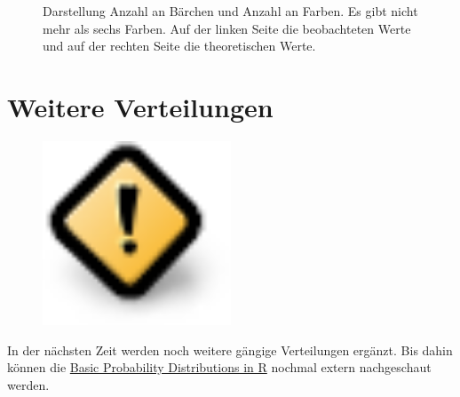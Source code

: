 \documentclass[
  letterpaper,
]{scrbook}
\begin{document}
\begin{figure}
\begin{minipage}[t]{0.50\linewidth}
{{}

}

\end{minipage}%

\caption{\label{fig-pois-03}Darstellung Anzahl an Bärchen und Anzahl an
Farben. Es gibt nicht mehr als sechs Farben. Auf der linken Seite die
beobachteten Werte und auf der rechten Seite die theoretischen Werte.}

\end{figure}

\hypertarget{weitere-verteilungen}{%
\section{Weitere Verteilungen}\label{weitere-verteilungen}}

\begin{figure}

{\centering \includegraphics[width=0.5\textwidth,height=\textheight]{./images/caution.png}

}

\end{figure}


In der nächsten Zeit werden noch weitere gängige Verteilungen ergänzt.
Bis dahin können die
\href{https://rstudio-pubs-static.s3.amazonaws.com/100906_8e3a32dd11c14b839468db756cee7400.html}{Basic
Probability Distributions in R} nochmal extern nachgeschaut werden.
\end{document}
